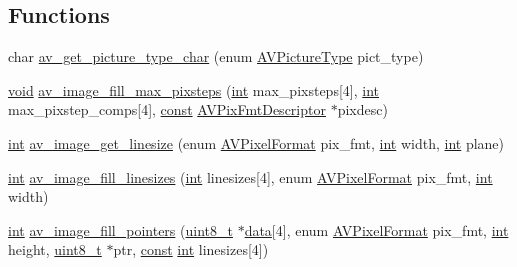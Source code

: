 \subsection*{Functions}
\begin{DoxyCompactItemize}
\item 
char \hyperlink{group__lavu__picture_gacbf2ea8b2b89924c890ef8ec10a3d922}{av\+\_\+get\+\_\+picture\+\_\+type\+\_\+char} (enum \hyperlink{group__lavu__picture_gae6cbcab1f70d8e476757f1c1f5a0a78e}{A\+V\+Picture\+Type} pict\+\_\+type)
\item 
\hyperlink{sound_8c_ae35f5844602719cf66324f4de2a658b3}{void} \hyperlink{group__lavu__picture_gad3af84de3a86a9ebb71715e3c0ebf627}{av\+\_\+image\+\_\+fill\+\_\+max\+\_\+pixsteps} (\hyperlink{xmltok_8h_a5a0d4a5641ce434f1d23533f2b2e6653}{int} max\+\_\+pixsteps\mbox{[}4\mbox{]}, \hyperlink{xmltok_8h_a5a0d4a5641ce434f1d23533f2b2e6653}{int} max\+\_\+pixstep\+\_\+comps\mbox{[}4\mbox{]}, \hyperlink{getopt1_8c_a2c212835823e3c54a8ab6d95c652660e}{const} \hyperlink{struct_a_v_pix_fmt_descriptor}{A\+V\+Pix\+Fmt\+Descriptor} $\ast$pixdesc)
\item 
\hyperlink{xmltok_8h_a5a0d4a5641ce434f1d23533f2b2e6653}{int} \hyperlink{group__lavu__picture_ga8eddd074d5eb6a235591013675ac1055}{av\+\_\+image\+\_\+get\+\_\+linesize} (enum \hyperlink{pixfmt_8h_a9a8e335cf3be472042bc9f0cf80cd4c5}{A\+V\+Pixel\+Format} pix\+\_\+fmt, \hyperlink{xmltok_8h_a5a0d4a5641ce434f1d23533f2b2e6653}{int} width, \hyperlink{xmltok_8h_a5a0d4a5641ce434f1d23533f2b2e6653}{int} plane)
\item 
\hyperlink{xmltok_8h_a5a0d4a5641ce434f1d23533f2b2e6653}{int} \hyperlink{group__lavu__picture_gaccd7fda79188060dadb28408223946ef}{av\+\_\+image\+\_\+fill\+\_\+linesizes} (\hyperlink{xmltok_8h_a5a0d4a5641ce434f1d23533f2b2e6653}{int} linesizes\mbox{[}4\mbox{]}, enum \hyperlink{pixfmt_8h_a9a8e335cf3be472042bc9f0cf80cd4c5}{A\+V\+Pixel\+Format} pix\+\_\+fmt, \hyperlink{xmltok_8h_a5a0d4a5641ce434f1d23533f2b2e6653}{int} width)
\item 
\hyperlink{xmltok_8h_a5a0d4a5641ce434f1d23533f2b2e6653}{int} \hyperlink{group__lavu__picture_ga4513d36f527c1476e89845631d975542}{av\+\_\+image\+\_\+fill\+\_\+pointers} (\hyperlink{lib-src_2ffmpeg_2win32_2stdint_8h_a9a941819355e6f658991890ff66b4b0e}{uint8\+\_\+t} $\ast$\hyperlink{lib_2expat_8h_ac39e72a1de1cb50dbdc54b08d0432a24}{data}\mbox{[}4\mbox{]}, enum \hyperlink{pixfmt_8h_a9a8e335cf3be472042bc9f0cf80cd4c5}{A\+V\+Pixel\+Format} pix\+\_\+fmt, \hyperlink{xmltok_8h_a5a0d4a5641ce434f1d23533f2b2e6653}{int} height, \hyperlink{lib-src_2ffmpeg_2win32_2stdint_8h_a9a941819355e6f658991890ff66b4b0e}{uint8\+\_\+t} $\ast$ptr, \hyperlink{getopt1_8c_a2c212835823e3c54a8ab6d95c652660e}{const} \hyperlink{xmltok_8h_a5a0d4a5641ce434f1d23533f2b2e6653}{int} linesizes\mbox{[}4\mbox{]})

\end{DoxyCompactItemize}
